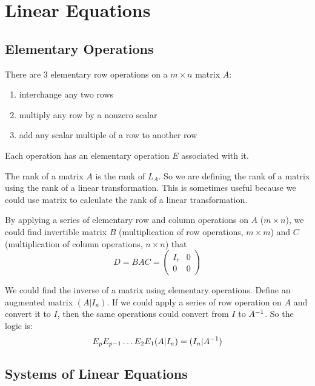 \chapter{Linear Equations}

\section{Elementary Operations}

There are 3 elementary row operations on a $m \times n$ matrix $A$:
\begin{enumerate}
    \item interchange any two rows
    \item multiply any row by a nonzero scalar
    \item add any scalar multiple of a row to another row
\end{enumerate}

Each operation has an elementary operation $E$ associated with it.


The rank of a matrix $A$ is the rank of $L_A$. So we are defining the rank of a matrix using the rank of a linear transformation. This is sometimes useful because we could use matrix to calculate the rank of a linear transformation.

By applying a series of elementary row and column operations on $A$ ($m \times n$), we could find invertible matrix $B$ (multiplication of row operations, $m \times m$) and $C$ (multiplication of column operations, $n \times n$) that
\begin{equation*}
    D = B A C = \begin{pmatrix}
        I_r & 0 \\
        0 & 0
    \end{pmatrix}
\end{equation*}

We could find the inverse of a matrix using elementary operations. Define an augmented matrix $(A|I_n)$. If we could apply a series of row operation on $A$ and convert it to $I$, then the same operations could convert from $I$ to ${A}^{-1}$. So the logic is:
\begin{equation}
    E_p E_{p-1} \hdots E_2 E_1 (A|I_n) = (I_n | {A}^{-1} )
\end{equation}


\section{Systems of Linear Equations}

